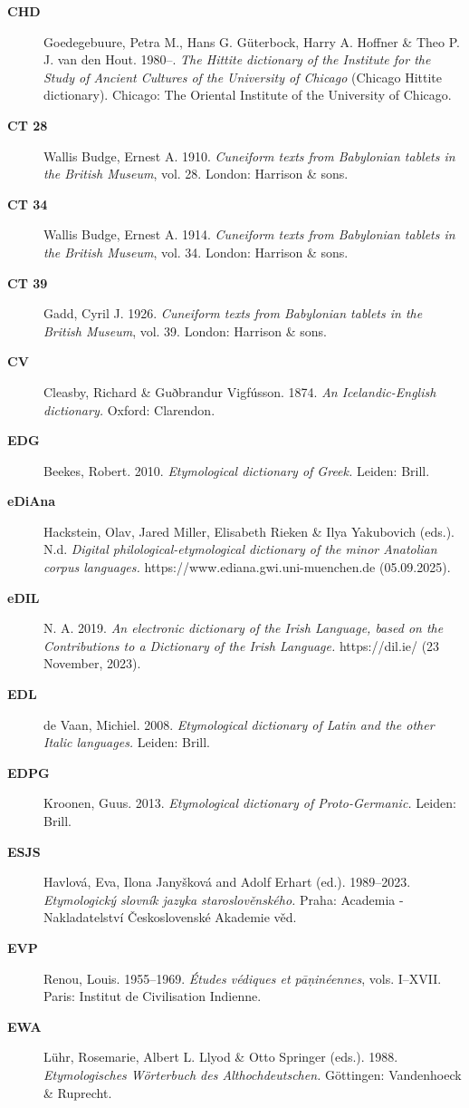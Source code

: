 \begin{description}
\item[\bfseries\upshape CHD]Goedegebuure, Petra M., Hans G. Güterbock, Harry A. Hoffner \& Theo P. J. van den Hout. 1980–. \emph{The Hittite dictionary of the Institute for the Study of Ancient Cultures of the University of Chicago} (Chicago Hittite dictionary). Chicago: The Oriental Institute of the University of Chicago.
\item[\bfseries\upshape CT 28]Wallis Budge, Ernest A. 1910. \emph{Cuneiform texts from Babylonian tablets in the British Museum}, vol. 28. London: Harrison \& sons.
\item[\bfseries\upshape CT 34]Wallis Budge, Ernest A. 1914. \emph{Cuneiform texts from Babylonian tablets in the British Museum}, vol. 34. London: Harrison \& sons.
\item[\bfseries\upshape CT 39]Gadd, Cyril J. 1926. \emph{Cuneiform texts from Babylonian tablets in the British Museum}, vol. 39. London: Harrison \& sons.
\item[\bfseries\upshape CV]Cleasby, Richard \& Guðbrandur Vigfússon. 1874. \emph{An Icelandic-English dictionary.} Oxford: Clarendon.
\item[\bfseries\upshape EDG]Beekes, Robert. 2010. \emph{Etymological dictionary of Greek.} Leiden: Brill.
\item[\bfseries\upshape eDiAna]Hackstein, Olav, Jared Miller, Elisabeth Rieken \& Ilya Yakubovich (eds.). N.d. \emph{Digital philological-etymological dictionary of the minor Anatolian corpus languages.} https://www.ediana.gwi.uni-muenchen.de (05.09.2025).
\item[\bfseries\upshape eDIL]N. A. 2019. \emph{An electronic dictionary of the Irish Language, based on the Contributions to a Dictionary of the Irish Language.} https://dil.ie/ (23 November, 2023).
\item[\bfseries\upshape EDL]de Vaan, Michiel. 2008. \emph{Etymological dictionary of Latin and the other Italic languages.} Leiden: Brill.
\item[\bfseries\upshape EDPG]Kroonen, Guus. 2013. \emph{Etymological dictionary of Proto-Germanic.} Leiden: Brill.
\item[\bfseries\upshape ESJS]Havlová, Eva, Ilona Janyšková and Adolf Erhart (ed.). 1989–2023. \emph{Etymologický slovník jazyka staroslověnského.} Praha: Academia - Nakladatelství Československé Akademie věd.
\item[\bfseries\upshape EVP]Renou, Louis. 1955–1969. \emph{Études védiques et pāṇinéennes}, vols. I–XVII. Paris: Institut de Civilisation Indienne.
\item[\bfseries\upshape EWA]Lühr, Rosemarie, Albert L. Llyod \& Otto Springer (eds.). 1988. \emph{Etymologisches Wörterbuch des Althochdeutschen.} Göttingen: Vandenhoeck \& Ruprecht.

\end{description}
